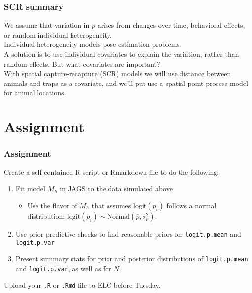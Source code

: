 \documentclass[color=usenames,dvipsnames]{beamer}\usepackage[]{graphicx}\usepackage[]{color}
\begin{document}











\begin{frame}
  \frametitle{SCR summary}
  We assume that variation in $p$ arises from changes over time,
  behavioral effects, or random individual heterogeneity. \\
  \pause \vfill
  Individual heterogeneity models pose estimation problems. \\
  \pause \vfill
  A solution is to use individual covariates to explain the variation,
  rather than random effects. \pause But what covariates are
  important? \\
  \pause \vfill
  With spatial capture-recapture (SCR) models we will use
  \alert{distance between animals and traps} as a covariate, and we'll
  put use a spatial point process model for animal locations. 
\end{frame}




\section{Assignment}




\begin{frame}[fragile]
  \frametitle{Assignment}
  Create a self-contained R script or Rmarkdown file to do the
  following: 
  \vfill
  \begin{enumerate}
    \item Fit model $M_h$ in JAGS to the data simulated above
      \begin{itemize}
        \item Use the flavor of $M_h$ that assumes $\mathrm{logit}(p_i)$ follows a
          normal distribution: $\mathrm{logit}(p_i) \sim
          \mathrm{Normal}(\bar{p}, \sigma^2_p)$.  
      \end{itemize}
    \item Use prior predictive checks to find reasonable priors for
      {\tt logit.p.mean} and {\tt logit.p.var}
    \item Present summary stats for prior and posterior distributions
      of {\tt logit.p.mean} and {\tt logit.p.var}, as well as for
      $N$. 
  \end{enumerate}
  \vfill
  Upload your {\tt .R} or {\tt .Rmd} file to ELC before Tuesday. 
\end{frame}
\end{document}

